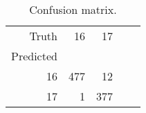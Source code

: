 \begin{table}[h]
\centering
\caption{Confusion matrix.}
\label{table:5}
\begin{tabular}{rrrrr}
\toprule
Truth & 16 & 17 \\
Predicted &  &  \\
\midrule
16 & 477 & 12 \\
17 & 1 & 377 \\
\bottomrule
\end{tabular}
\end{table}
